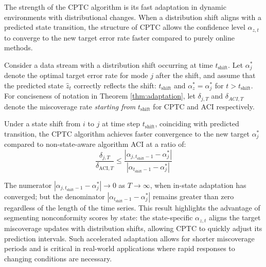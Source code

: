 The strength of the CPTC algorithm is its fast adaptation in dynamic environments with distributional changes. When a distribution shift aligns with a predicted state transition, the structure of CPTC allows the confidence level $\alpha_{z,t}$ to converge to the new target error rate faster compared to purely online methods.

Consider a data stream with a distribution shift occurring at time $t_{{\text{shift}}}$. Let $\alpha^*_{j}$ denote the optimal target error rate for mode $j$ after the shift, and assume that the predicted state $\hat{z}_t$ correctly reflects the shift: $t_{\text{shift}}$ and $\alpha^*_{z} = \alpha^*_{j}$ for $t > t_{{\text{shift}}}$. For conciseness of notation in Theorem \ref{thm:adaptation}, let $\delta_{j,T}$ and $\delta_{ACI,T}$ denote the miscoverage rate \textit{starting from } $t_{\text{shift}}$ for CPTC and ACI respectively.

\vspace{0.1em}
\begin{theorem}
Under a state shift from $i$ to $j$ at time step $t_{\text{shift}}$, coinciding with predicted transition, the CPTC algorithm achieves faster convergence to the new target $\alpha^*_{j}$ compared to non-state-aware algorithm ACI at a ratio of:
\[
\frac{\delta_{j,T}}{\delta_{\text{ACI},T}} \leq \frac{|\alpha_{j, t_{\text{shift}}-1}  - \alpha^{*}_{j}|}{|\alpha_{ t_{\text{shift}}-1} - \alpha^{*}_{j}|}
\]
\label{thm:adaptation}
\end{theorem}
\vspace{-1em}
%
The numerator $|\alpha_{j, t_{\text{shift}}-1}  - \alpha^{*}_{j}| \rightarrow 0$ as $T \rightarrow \infty$, when in-state adaptation has converged; but the denominator $|\alpha_{ t_{\text{shift}}-1} - \alpha^{*}_{j}|$ remains greater than zero regardless of the length of the time series. This result highlights the advantage of segmenting nonconformity scores by state: the state-specific $\alpha_{z,t}$ aligns the target miscoverage updates with distribution shifts, allowing CPTC to quickly adjust its prediction intervals. Such accelerated adaptation allows for shorter miscoverage periods and is critical in real-world applications where rapid responses to changing conditions are necessary.

